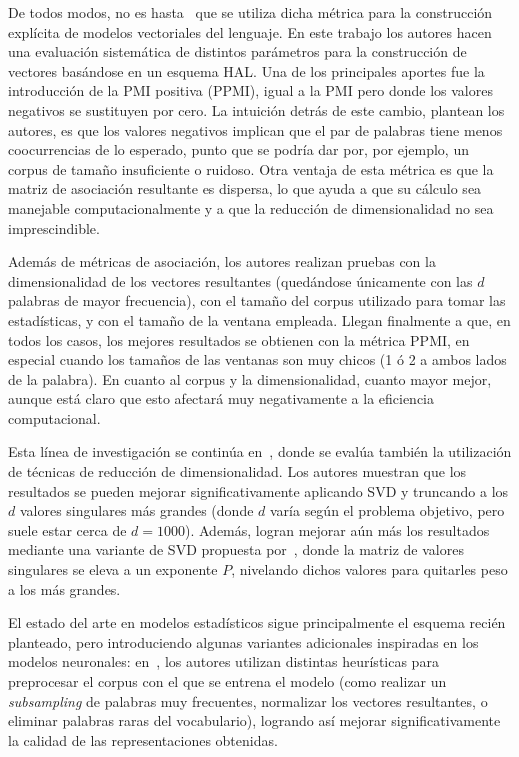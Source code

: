 De todos modos, no es hasta~\cite{BullinariaLevy2007} que se utiliza dicha métrica para la
construcción explícita de modelos vectoriales del lenguaje. En este trabajo los autores hacen una
evaluación sistemática de distintos parámetros para la construcción de vectores basándose en un
esquema HAL\@. Una de los principales aportes fue la introducción de la PMI positiva (PPMI), igual a
la PMI pero donde los valores negativos se sustituyen por cero. La intuición detrás de este cambio,
plantean los autores, es que los valores negativos implican que el par de palabras tiene menos
coocurrencias de lo esperado, punto que se podría dar por, por ejemplo, un corpus de tamaño
insuficiente o ruidoso. Otra ventaja de esta métrica es que la matriz de asociación resultante es
dispersa, lo que ayuda a que su cálculo sea manejable computacionalmente y a que la reducción de
dimensionalidad no sea imprescindible.

Además de métricas de asociación, los autores realizan pruebas con la dimensionalidad de los
vectores resultantes (quedándose únicamente con las $d$ palabras de mayor frecuencia), con el tamaño
del corpus utilizado para tomar las estadísticas, y con el tamaño de la ventana empleada. Llegan
finalmente a que, en todos los casos, los mejores resultados se obtienen con la métrica PPMI, en
especial cuando los tamaños de las ventanas son muy chicos (1 ó 2 a ambos lados de la palabra). En
cuanto al corpus y la dimensionalidad, cuanto mayor mejor, aunque está claro que esto afectará muy
negativamente a la eficiencia computacional.

Esta línea de investigación se continúa en~\cite{BullinariaLevy2012}, donde se evalúa también la
utilización de técnicas de reducción de dimensionalidad. Los autores muestran que los resultados se
pueden mejorar significativamente aplicando SVD y truncando a los $d$ valores singulares más grandes
(donde $d$ varía según el problema objetivo, pero suele estar cerca de $d = 1000$).  Además, logran
mejorar aún más los resultados mediante una variante de SVD propuesta por~\cite{Caron2001}, donde
la matriz de valores singulares se eleva a un exponente $P$, nivelando dichos valores para quitarles
peso a los más grandes.


El estado del arte en modelos estadísticos sigue principalmente el esquema recién planteado, pero
introduciendo algunas variantes adicionales inspiradas en los modelos neuronales:
en~\cite{Levy2015}, los autores utilizan distintas heurísticas para preprocesar el corpus con el que
se entrena el modelo (como realizar un \textit{subsampling} de palabras muy frecuentes, normalizar
los vectores resultantes, o eliminar palabras raras del vocabulario), logrando así mejorar
significativamente la calidad de las representaciones obtenidas.


